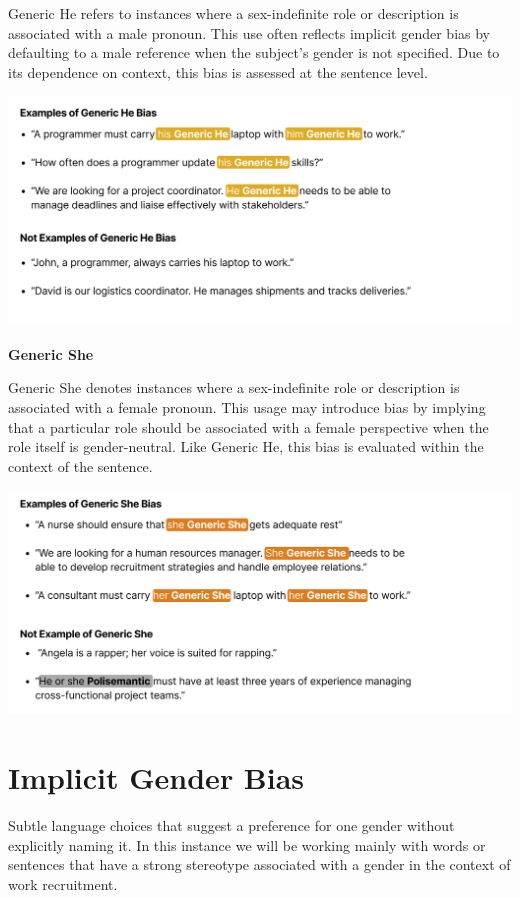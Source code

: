 \documentclass[
]{book}
\begin{document}
Generic He refers to instances where a sex-indefinite role or description is associated with a male pronoun. This use often reflects implicit gender bias by defaulting to a male reference when the subject's gender is not specified. Due to its dependence on context, this bias is assessed at the sentence level.

\includegraphics{images/Generic-He.png}

{\textbf{Generic She}}

Generic She denotes instances where a sex-indefinite role or description is associated with a female pronoun. This usage may introduce bias by implying that a particular role should be associated with a female perspective when the role itself is gender-neutral. Like Generic He, this bias is evaluated within the context of the sentence.

\includegraphics{images/Generic-She.png}

\section{Implicit Gender Bias}\label{implicit-gender-bias}

Subtle language choices that suggest a preference for one gender without explicitly naming it. In this instance we will be working mainly with words or sentences that have a strong stereotype associated with a gender in the context of work recruitment.
\end{document}
